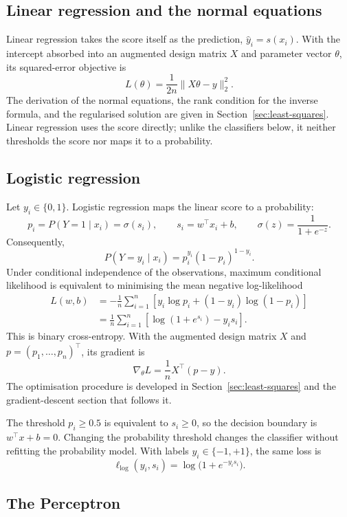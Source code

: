\subsection{Linear regression and the normal equations}
\label{sec:linear-score-regression}

Linear regression takes the score itself as the prediction,
$\hat y_i=s(x_i)$. With the intercept absorbed into an augmented design matrix
$X$ and parameter vector $\theta$, its squared-error objective is
\[
L(\theta)=\frac{1}{2n}\lVert X\theta-y\rVert_2^2.
\]
The derivation of the normal equations, the rank condition for the inverse
formula, and the regularised solution are given in
Section~\ref{sec:least-squares}. Linear regression uses the score directly;
unlike the classifiers below, it neither thresholds the score nor maps it to a
probability.

\subsection{Logistic regression}

Let $y_i\in\{0,1\}$. Logistic regression maps the linear score to a probability:
\[
p_i=P(Y=1\mid x_i)=\sigma(s_i),
\qquad
s_i=w^\top x_i+b,
\qquad
\sigma(z)=\frac{1}{1+e^{-z}}.
\]
Consequently,
\[
P(Y=y_i\mid x_i)=p_i^{y_i}(1-p_i)^{1-y_i}.
\]
Under conditional independence of the observations, maximum conditional
likelihood is equivalent to minimising the mean negative log-likelihood
\begin{align*}
L(w,b)
&=-\frac1n\sum_{i=1}^{n}
\left[y_i\log p_i+(1-y_i)\log(1-p_i)\right]\\
&=\frac1n\sum_{i=1}^{n}
\left[\log(1+e^{s_i})-y_is_i\right].
\end{align*}
This is binary cross-entropy. With the augmented design matrix $X$ and
$p=(p_1,\ldots,p_n)^\top$, its gradient is
\[
\nabla_\theta L=\frac1nX^\top(p-y).
\]
The optimisation procedure is developed in Section~\ref{sec:least-squares} and
the gradient-descent section that follows it.

The threshold $p_i\ge0.5$ is equivalent to $s_i\ge0$, so the decision boundary
is $w^\top x+b=0$. Changing the probability threshold changes the classifier
without refitting the probability model. With labels $y_i\in\{-1,+1\}$, the
same loss is
\[
\ell_{\mathrm{log}}(y_i,s_i)
=\log\bigl(1+e^{-y_is_i}\bigr).
\]

\subsection{The Perceptron}
\label{sec:perceptron}

